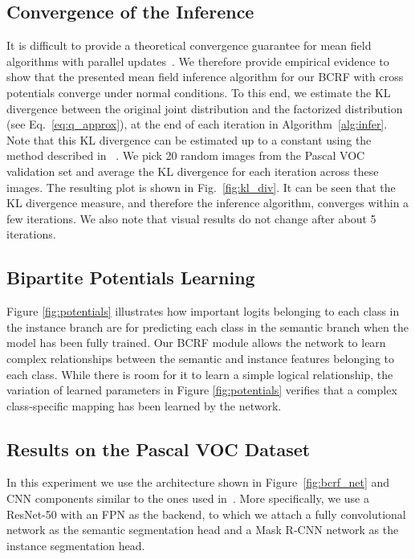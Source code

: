 \subsection{Convergence of the Inference}
It is difficult to provide a theoretical convergence guarantee for mean field algorithms with parallel updates~\cite{Higherorder_mf, Koller_book}. We therefore provide empirical evidence to show that the presented mean field inference algorithm for our BCRF with cross potentials converge under normal conditions. To this end, we estimate the KL divergence between the original joint distribution and the factorized distribution (see Eq.~\eqref{eq:q_approx}), at the end of each iteration in Algorithm~\ref{alg:infer}. Note that this KL divergence can be estimated up to a constant using the method described in ~\cite{densecrf_suppl}. We pick 20 random images from the Pascal VOC validation set and average the KL divergence for each iteration across these images. The resulting plot is shown in Fig.~\ref{fig:kl_div}. It can be seen that the KL divergence measure, and therefore the inference algorithm, converges within a few iterations. We also note that visual results do not change after about 5 iterations.

\subsection{Bipartite Potentials Learning}
Figure \ref{fig:potentials} illustrates how important logits belonging to each class in the instance branch are for predicting each class in the semantic branch when the model has been fully trained. Our BCRF module allows the network to learn complex relationships between the semantic and instance features belonging to each class. While there is room for it to learn a simple logical relationship, the variation of learned parameters in Figure \ref{fig:potentials} verifies that a complex class-specific mapping has been learned by the network. 

\subsection{Results on the Pascal VOC Dataset}
In this experiment we use the architecture shown in Figure~\ref{fig:bcrf_net} and CNN components similar to the ones used in~\cite{Upsnet_paper}. More specifically, we use a ResNet-50 with an FPN as the backend, to which we attach a fully convolutional network as the semantic segmentation head and a Mask R-CNN network as the instance segmentation head. 

